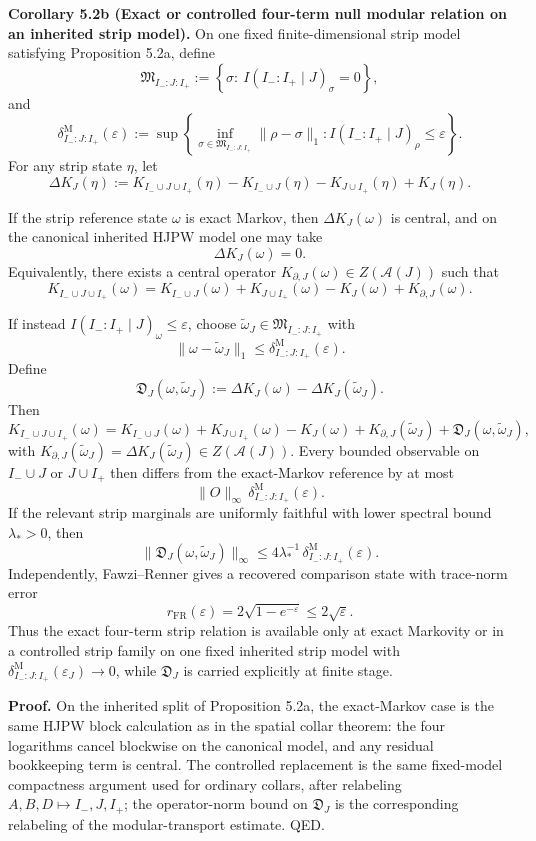 \textbf{Corollary 5.2b (Exact or controlled four-term null modular relation on an inherited strip model).} On one fixed finite-dimensional strip model satisfying Proposition 5.2a, define
\[
\mathfrak M_{I_-:J:I_+}
:=
\left\{
\sigma:\ I(I_-:I_+\mid J)_\sigma=0
\right\},
\]
and
\[
\delta^{\mathrm M}_{I_-:J:I_+}(\varepsilon)
:=
\sup\left\{
\inf_{\sigma\in\mathfrak M_{I_-:J:I_+}}\|\rho-\sigma\|_1:
I(I_-:I_+\mid J)_\rho\le\varepsilon
\right\}.
\]
For any strip state \(\eta\), let
\[
\Delta K_J(\eta)
:=
K_{I_-\cup J\cup I_+}(\eta)-K_{I_-\cup J}(\eta)-K_{J\cup I_+}(\eta)+K_J(\eta).
\]

If the strip reference state \(\omega\) is exact Markov, then \(\Delta K_J(\omega)\) is central, and on the canonical inherited HJPW model one may take
\[
\Delta K_J(\omega)=0.
\]
Equivalently, there exists a central operator \(K_{\partial,J}(\omega)\in Z(\mathcal A(J))\) such that
\[
K_{I_-\cup J\cup I_+}(\omega)
=
K_{I_-\cup J}(\omega)+K_{J\cup I_+}(\omega)-K_J(\omega)+K_{\partial,J}(\omega).
\]

If instead \(I(I_-:I_+\mid J)_\omega\le\varepsilon\), choose \(\widetilde\omega_J\in\mathfrak M_{I_-:J:I_+}\) with
\[
\|\omega-\widetilde\omega_J\|_1
\le
\delta^{\mathrm M}_{I_-:J:I_+}(\varepsilon).
\]
Define
\[
\mathfrak D_J(\omega,\widetilde\omega_J)
:=
\Delta K_J(\omega)-\Delta K_J(\widetilde\omega_J).
\]
Then
\[
K_{I_-\cup J\cup I_+}(\omega)
=
K_{I_-\cup J}(\omega)+K_{J\cup I_+}(\omega)-K_J(\omega)
+K_{\partial,J}(\widetilde\omega_J)
+\mathfrak D_J(\omega,\widetilde\omega_J),
\]
with \(K_{\partial,J}(\widetilde\omega_J)=\Delta K_J(\widetilde\omega_J)\in Z(\mathcal A(J))\). Every bounded observable on \(I_-\cup J\) or \(J\cup I_+\) then differs from the exact-Markov reference by at most
\[
\|O\|_\infty\,\delta^{\mathrm M}_{I_-:J:I_+}(\varepsilon).
\]
If the relevant strip marginals are uniformly faithful with lower spectral bound \(\lambda_\ast>0\), then
\[
\|\mathfrak D_J(\omega,\widetilde\omega_J)\|_\infty
\le
4\lambda_\ast^{-1}\,\delta^{\mathrm M}_{I_-:J:I_+}(\varepsilon).
\]
Independently, Fawzi--Renner gives a recovered comparison state with trace-norm error
\[
r_{\mathrm{FR}}(\varepsilon)=2\sqrt{1-e^{-\varepsilon}}\le 2\sqrt{\varepsilon}.
\]
Thus the exact four-term strip relation is available only at exact Markovity or in a controlled strip family on one fixed inherited strip model with \(\delta^{\mathrm M}_{I_-:J:I_+}(\varepsilon_J)\to0\), while \(\mathfrak D_J\) is carried explicitly at finite stage.

\textbf{Proof.} On the inherited split of Proposition 5.2a, the exact-Markov case is the same HJPW block calculation as in the spatial collar theorem: the four logarithms cancel blockwise on the canonical model, and any residual bookkeeping term is central. The controlled replacement is the same fixed-model compactness argument used for ordinary collars, after relabeling \(A,B,D\mapsto I_-,J,I_+\); the operator-norm bound on \(\mathfrak D_J\) is the corresponding relabeling of the modular-transport estimate. QED.

